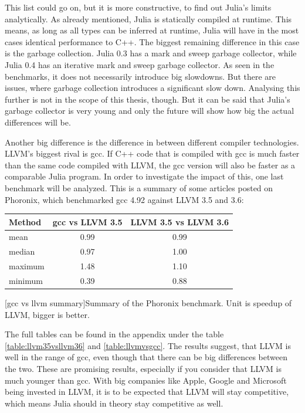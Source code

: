 This list could go on, but it is more constructive, to find out Julia's limits analytically.
As already mentioned, Julia is statically compiled at runtime. This means, as long as all types can be inferred at runtime, Julia will have in the most cases identical performance to C++.
The biggest remaining difference in this case is the garbage collection. Julia 0.3 has a mark and sweep garbage collector, while Julia 0.4 has an iterative mark and sweep garbage collector.
As seen in the benchmarks, it does not necessarily introduce big slowdowns.
But there are issues, where garbage collection introduces a significant slow down\cite{ReadDlmGC}.
Analysing this further is not in the scope of this thesis, though. 
But it can be said that Julia's garbage collector is very young and only the future will show how big the actual differences will be.

Another big difference is the difference in between different compiler technologies.
\ac{LLVM}'s biggest rival is \ac{gcc}. If C++ code that is compiled with \ac{gcc} is much faster than the same code compiled with \ac{LLVM}, the \ac{gcc} version will also be faster as a comparable Julia program.
In order to investigate the impact of this, one last benchmark will be analyzed.
This is a summary of some articles posted on Phoronix, which benchmarked \ac{gcc} 4.92 against \ac{LLVM} 3.5 and 3.6:
\begin{table}[ht]
  \centering
  \begin{tabular}{l|c|c}
    \hline
    \textbf{Method} & \textbf{\ac{gcc} vs \ac{LLVM} 3.5} & \textbf{\ac{LLVM} 3.5 vs \ac{LLVM} 3.6} \\
    \hline
    mean & 0.99 & 0.99 \\
    median & 0.97 & 1.00 \\
    maximum & 1.48 & 1.10 \\
    minimum & 0.39 & 0.88 \\
    \hline
  \end{tabular}
    [gcc vs llvm summary]{Summary of the Phoronix benchmark. Unit is speedup of LLVM, bigger is better. \cite{LLVM35vsLLVM36}\cite{LLVMvsGCC}\cite{Phoronix}}
    \label{table:gccvsllvm}
\end{table}

The full tables can be found in the appendix under the table \ref{table:llvm35vsllvm36} and \ref{table:llvmvsgcc}.
The results suggest, that \ac{LLVM} is well in the range of \ac{gcc}, even though that there can be big differences between the two.
These are promising results, especially if you consider that LLVM is much younger than gcc. 
With big companies like Apple, Google\cite{GoogleAppleLLVM} and Microsoft\cite{MicrosoftLLVM} being invested in LLVM, it is to be expected that \ac{LLVM} will stay competitive, which means Julia should in theory stay competitive as well.


